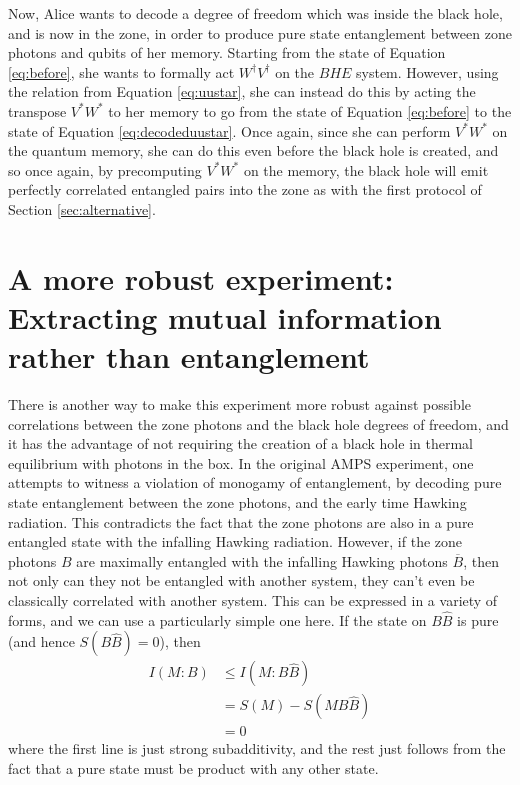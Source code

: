 \documentclass[11pt,a4paper]{article}
\begin{document}
Now, Alice wants to decode a degree of freedom which was inside the black hole, and is now in the zone, in order to produce pure state entanglement between zone photons and
qubits of her memory. Starting from the state of Equation \eqref{eq:before}, she wants to formally act $W^\dagger V^\dagger$ on the $BHE$ system. However, using the relation
from Equation \eqref{eq:uustar}, she can instead do this by acting the transpose $V^*W^*$ to her memory to go from the state of Equation \eqref{eq:before} to the state of Equation \eqref{eq:decodeduustar}. Once again, since she can perform  $V^*W^*$ on the quantum memory, she can do this even before the black hole is created, and so once again, by precomputing $V^*W^*$ on the memory, the black hole will emit perfectly correlated entangled pairs into the zone as with the first protocol of Section \ref{sec:alternative}. 




\section{A more robust experiment: Extracting mutual information rather than entanglement}
\label{sec:robust}

There is another way to make this experiment more robust against possible correlations between the zone photons and the black hole degrees of freedom, and it has the advantage of not requiring the creation of a black hole in thermal equilibrium with photons in the box. In the original AMPS experiment, one attempts to witness a violation of  monogamy of entanglement, by decoding pure state entanglement between the zone photons, and the early time Hawking radiation. This contradicts the fact that the zone photons are also in a pure entangled state with the infalling Hawking radiation. However, if the zone photons $B$ are maximally entangled with the infalling Hawking photons ${\overline B}$, then not only can they not be entangled with another system, they can't even be classically correlated with another system. This can be expressed in a variety of forms\cite{koashi2004monogamy}, and we can use a particularly simple one here. If the state on $B{\hat B}$ is pure (and hence $S(B{\hat B})=0$), then
\begin{align}
I(M:B)&\leq I(M:B\hat{B})\\
&=S(M)-S(MB\hat{B})\\
&=0
\end{align}
where the first line is just strong subadditivity, and the rest just follows from the fact that a pure state must be product with any other state.
\end{document}
